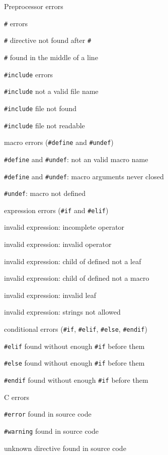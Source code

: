 \documentclass[12pt]{article}
\newcounter{ol}
\newcounter{oll}
\newcounter{olll}
\newcommand{\li}{
    \setcounter{olll}{0}
    \setcounter{oll}{0}
    \addtocounter{ol}{1}
    \item[\theol00.]
}
\newcommand{\lii}{
    \setcounter{olll}{0}
    \addtocounter{oll}{1}
    \item[\theol\theoll0.]
}
\newcommand{\liii}{
    \addtocounter{olll}{1}
    \item[\theol\theoll\theolll.]
}
\begin{document}
\begin{description}
    \li Preprocessor errors
    \begin{description}
        \lii \verb|#| errors
        \begin{description}
            \liii \verb|#| directive not found after \verb|#|
            \liii \verb|#| found in the middle of a line
        \end{description}
        \lii \verb|#include| errors
        \begin{description}
            \liii \verb|#include| not a valid file name
            \liii \verb|#include| file not found
            \liii \verb|#include| file not readable
        \end{description}
        \lii macro errors (\verb|#define| and \verb|#undef|)
        \begin{description}
            \liii \verb|#define| and \verb|#undef|: not an valid macro name
            \liii \verb|#define| and \verb|#undef|: macro arguments never closed
            \liii \verb|#undef|: macro not defined
        \end{description}
        \lii expression errors (\verb|#if| and \verb|#elif|)
        \begin{description}
            \liii invalid expression: incomplete operator
            \liii invalid expression: invalid operator
            \liii invalid expression: child of defined not a leaf
            \liii invalid expression: child of defined not a macro
            \liii invalid expression: invalid leaf
            \liii invalid expression: strings not allowed
        \end{description}
        \lii conditional errors (\verb|#if|, \verb|#elif|, \verb|#else|, \verb|#endif|)
        \begin{description}
            \liii \verb|#elif| found without enough \verb|#if| before them
            \liii \verb|#else| found without enough \verb|#if| before them
            \liii \verb|#endif| found without enough \verb|#if| before them
        \end{description}
        \lii C errors
        \begin{description}
            \liii \verb|#error| found in source code
            \liii \verb|#warning| found in source code
            \liii unknown directive found in source code
        \end{description}
    \end{description}
\end{description}
\end{document}
